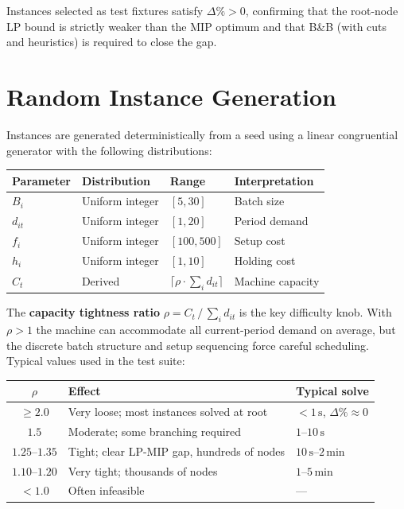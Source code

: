 \documentclass[11pt,a4paper]{article}
\begin{document}
Instances selected as test fixtures satisfy $\Delta\% > 0$, confirming that
the root-node LP bound is strictly weaker than the MIP optimum and that
B\&B (with cuts and heuristics) is required to close the gap.

\section{Random Instance Generation}

Instances are generated deterministically from a seed using a linear
congruential generator with the following distributions:

\begin{center}
\begin{tabular}{@{}llll@{}}
\toprule
\textbf{Parameter} & \textbf{Distribution} & \textbf{Range} & \textbf{Interpretation}\\
\midrule
$B_i$ & Uniform integer & $[5, 30]$ & Batch size \\
$d_{it}$ & Uniform integer & $[1, 20]$ & Period demand \\
$f_i$ & Uniform integer & $[100, 500]$ & Setup cost \\
$h_i$ & Uniform integer & $[1, 10]$ & Holding cost \\
$C_t$ & Derived & $\lceil\rho\cdot\sum_i d_{it}\rceil$ & Machine capacity \\
\bottomrule
\end{tabular}
\end{center}

The \textbf{capacity tightness ratio}
$\rho = C_t \,/\, \sum_i d_{it}$
is the key difficulty knob.  With $\rho>1$ the machine can accommodate all
current-period demand on average, but the discrete batch structure and setup
sequencing force careful scheduling.  Typical values used in the test suite:

\begin{center}
\begin{tabular}{@{}cll@{}}
\toprule
$\rho$ & \textbf{Effect} & \textbf{Typical solve} \\
\midrule
$\ge 2.0$ & Very loose; most instances solved at root & $< 1\,\text{s}$, $\Delta\%\approx 0$ \\
$1.5$     & Moderate; some branching required & $1$--$10\,\text{s}$\\
$1.25$--$1.35$ & Tight; clear LP-MIP gap, hundreds of nodes & $10\,\text{s}$--$2\,\text{min}$ \\
$1.10$--$1.20$ & Very tight; thousands of nodes & $1$--$5\,\text{min}$ \\
$< 1.0$   & Often infeasible & --- \\
\bottomrule
\end{tabular}
\end{center}
\end{document}
